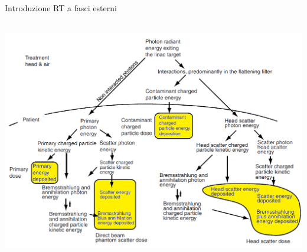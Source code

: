 \documentclass{beamer}
\begin{document}
\begin{frame}{Introduzione RT a fasci esterni}
\begin{center}
\small
{}\\ \vspace{.2cm}
\includegraphics[width=.8\textwidth]{../cap1/processes.PNG}
\end{center}
\end{frame}



\end{document}
